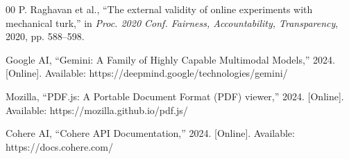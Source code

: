 \documentclass[conference]{IEEEtran}
\begin{document}
\begin{thebibliography}{00}
 P. Raghavan et al., ``The external validity of online experiments with mechanical turk,'' in \textit{Proc. 2020 Conf. Fairness, Accountability, Transparency}, 2020, pp. 588--598.

 Google AI, ``Gemini: A Family of Highly Capable Multimodal Models,'' 2024. [Online]. Available: https://deepmind.google/technologies/gemini/

 Mozilla, ``PDF.js: A Portable Document Format (PDF) viewer,'' 2024. [Online]. Available: https://mozilla.github.io/pdf.js/

 Cohere AI, ``Cohere API Documentation,'' 2024. [Online]. Available: https://docs.cohere.com/

\end{thebibliography}
\end{document}
